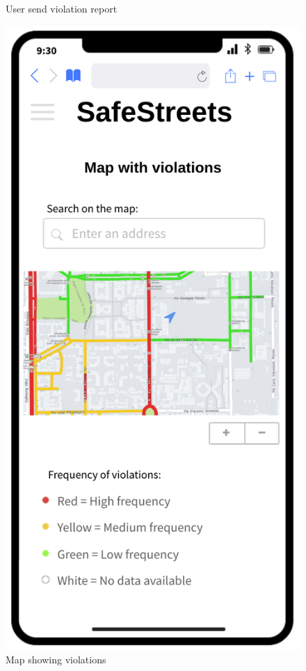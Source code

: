 \begin{figure}[H]
\begin{minipage}[b]{0.40\textwidth}
		\caption{User send violation report}
	\end{minipage}
	\hfill
	\begin{minipage}[b]{0.40\textwidth}
		\includegraphics[width=\textwidth]{Images/dd-mocks/violationsMap.png}
		\caption{Map showing violations}
	\end{minipage}
\end{figure}


